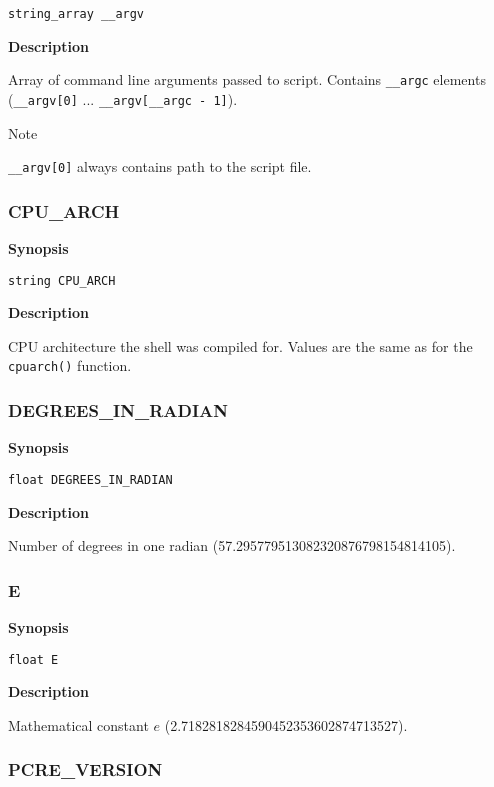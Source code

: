 \documentclass[a4paper, 10pt, titlepage]{article}
\begin{document}
\begin{verbatim}
string_array __argv
\end{verbatim}

\textbf{Description}

Array of command line arguments passed to script. Contains \texttt{\_\_argc} elements (\texttt{\_\_argv[0]} ... \texttt{\_\_argv[\_\_argc - 1]}).

Note

\texttt{\_\_argv[0]} always contains path to the script file.

\subsubsection{CPU\_ARCH}

\textbf{Synopsis}

\begin{verbatim}
string CPU_ARCH
\end{verbatim}

\textbf{Description}

CPU architecture the shell was compiled for. Values are the same as for the \texttt{cpuarch()} function.

\subsubsection{DEGREES\_IN\_RADIAN}

\textbf{Synopsis}

\begin{verbatim}
float DEGREES_IN_RADIAN
\end{verbatim}

\textbf{Description}

Number of degrees in one radian (57.295779513082320876798154814105).

\subsubsection{E}

\textbf{Synopsis}

\begin{verbatim}
float E
\end{verbatim}

\textbf{Description}

Mathematical constant $e$ (2.7182818284590452353602874713527).

\subsubsection{PCRE\_VERSION}
\end{document}
